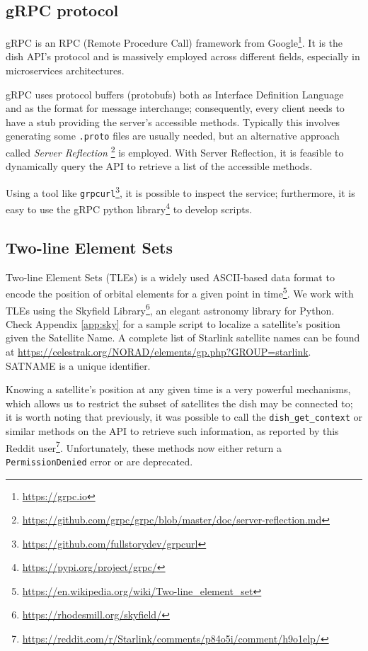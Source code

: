 \documentclass[IN,11pt,twoside,openright,idp,english]{tumthesis}
\begin{document}
\subsection{gRPC protocol}
    
gRPC is an RPC (Remote Procedure Call) framework from Google\footnote{\url{https://grpc.io}}. It is the dish API's protocol and is massively employed across different fields, especially in microservices architectures. 
    
gRPC uses protocol buffers (protobufs) both as Interface Definition Language and as the format for message interchange; consequently, every client needs to have a stub providing the server's accessible methods. Typically this involves generating some \texttt{.proto} files are usually needed, but an alternative approach called \textit{Server Reflection} \footnote{\url{https://github.com/grpc/grpc/blob/master/doc/server-reflection.md}} is employed. With Server Reflection, it is feasible to dynamically query the API to retrieve a list of the accessible methods.

Using a tool like \texttt{grpcurl}\footnote{\url{https://github.com/fullstorydev/grpcurl}}, it is possible to inspect the service; furthermore, it is easy to use the gRPC python library\footnote{\url{https://pypi.org/project/grpc/}} to develop scripts.
    
\subsection{Two-line Element Sets}
    
Two-line Element Sets (TLEs) is a widely used ASCII-based data format to encode the position of orbital elements for a given point in time\footnote{\url{https://en.wikipedia.org/wiki/Two-line_element_set}}. We work with TLEs using the Skyfield Library\footnote{\url{https://rhodesmill.org/skyfield/}}, an elegant astronomy library for Python. Check Appendix \ref{app:sky} for a sample script to localize a satellite's position given the Satellite Name. A complete list of Starlink satellite names can be found at \url{https://celestrak.org/NORAD/elements/gp.php?GROUP=starlink}. 
SATNAME is a unique identifier.
    
Knowing a satellite's position at any given time is a very powerful mechanisms, which allows us to restrict the subset of satellites the dish may be connected to; it is worth noting that previously, it was possible to call the \texttt{dish\_get\_context} or similar methods on the API to retrieve such information, as reported by this Reddit user\footnote{\url{https://reddit.com/r/Starlink/comments/p84o5i/comment/h9o1elp/}}. Unfortunately, these methods now either return a \texttt{PermissionDenied} error or are deprecated.
    
\end{document}
